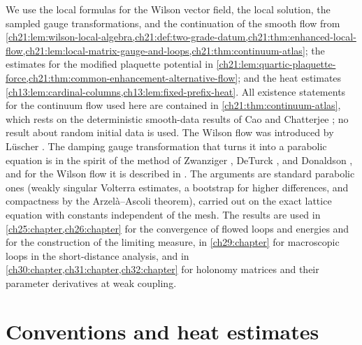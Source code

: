 We use the local formulas for the Wilson vector field, the local solution, the sampled gauge transformations, and the continuation of the smooth flow from \cref{ch21:lem:wilson-local-algebra,ch21:def:two-grade-datum,ch21:thm:enhanced-local-flow,ch21:lem:local-matrix-gauge-and-loops,ch21:thm:continuum-atlas}; the estimates for the modified plaquette potential in \cref{ch21:lem:quartic-plaquette-force,ch21:thm:common-enhancement-alternative-flow}; and the heat estimates \cref{ch13:lem:cardinal-columns,ch13:lem:fixed-prefix-heat}. All existence statements for the continuum flow used here are contained in \cref{ch21:thm:continuum-atlas}, which rests on the deterministic smooth-data results of Cao and Chatterjee \cite{CCHeat2022v4,CCState2023v4}; no result about random initial data is used. The Wilson flow was introduced by L\"uscher \cite{Luscher2010WilsonFlow}. The damping gauge transformation that turns it into a parabolic equation is in the spirit of the method of Zwanziger \cite{Zwanziger1981}, DeTurck \cite{DeTurck1983}, and Donaldson \cite{Donaldson1985}, and for the Wilson flow it is described in \cite[Section~2]{Luscher2010WilsonFlow}. The arguments are standard parabolic ones (weakly singular Volterra estimates, a bootstrap for higher differences, and compactness by the Arzel\`a--Ascoli theorem), carried out on the exact lattice equation with constants independent of the mesh. The results are used in \cref{ch25:chapter,ch26:chapter} for the convergence of flowed loops and energies and for the construction of the limiting measure, in \cref{ch29:chapter} for macroscopic loops in the short-distance analysis, and in \cref{ch30:chapter,ch31:chapter,ch32:chapter} for holonomy matrices and their parameter derivatives at weak coupling.

\section{Conventions and heat estimates}\label{ch22:sec:conventions}

